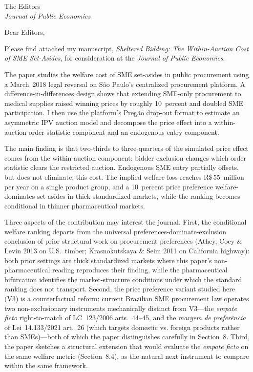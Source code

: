\documentclass[11pt]{letter}
\begin{document}
\begin{letter}{The Editors\\\emph{Journal of Public Economics}}

\opening{Dear Editors,}

Please find attached my manuscript, \emph{Sheltered Bidding: The Within-Auction Cost of SME Set-Asides}, for consideration at the \emph{Journal of Public Economics}.

The paper studies the welfare cost of SME set-asides in public procurement using a March~2018 legal reversal on São Paulo's centralized procurement platform. A difference-in-differences design shows that extending SME-only procurement to medical supplies raised winning prices by roughly 10~percent and doubled SME participation. I then use the platform's Pregão drop-out format to estimate an asymmetric IPV auction model and decompose the price effect into a within-auction order-statistic component and an endogenous-entry component.

The main finding is that two-thirds to three-quarters of the simulated price effect comes from the within-auction component: bidder exclusion changes which order statistic clears the restricted auction. Endogenous SME entry partially offsets, but does not eliminate, this cost. The implied welfare loss reaches R\$\,55~million per year on a single product group, and a 10~percent price preference welfare-dominates set-asides in thick standardized markets, while the ranking becomes conditional in thinner pharmaceutical markets.

Three aspects of the contribution may interest the journal. First, the conditional welfare ranking departs from the universal preferences-dominate-exclusion conclusion of prior structural work on procurement preferences (Athey, Coey \& Levin 2013 on U.S.\ timber; Krasnokutskaya \& Seim 2011 on California highway): both prior settings are thick standardized markets where this paper's non-pharmaceutical reading reproduces their finding, while the pharmaceutical bifurcation identifies the market-structure conditions under which the standard ranking does not transport. Second, the price preference variant studied here (V3) is a counterfactual reform: current Brazilian SME procurement law operates two non-exclusionary instruments mechanically distinct from V3---the \emph{empate ficto} right-to-match of LC~123/2006 arts.~44--45, and the \emph{margem de prefer\^encia} of Lei~14.133/2021 art.~26 (which targets domestic vs. foreign products rather than SMEs)---both of which the paper distinguishes carefully in Section~8. Third, the paper sketches a structural extension that would evaluate the \emph{empate ficto} on the same welfare metric (Section~8.4), as the natural next instrument to compare within the same framework.


\end{letter}
\end{document}
